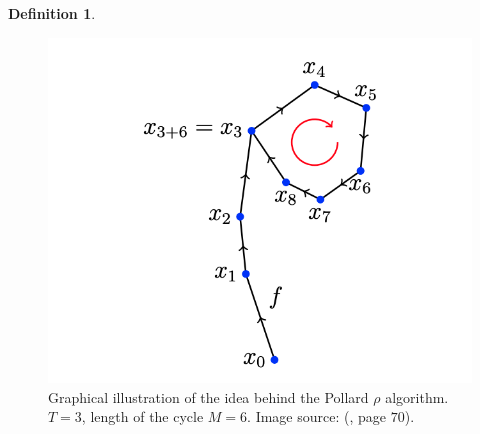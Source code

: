 \documentclass[thesis=M,english]{FITthesis}[2012/10/20]
\theoremstyle{remark}
\theoremstyle{definition}
\newtheorem{DF}{Definition}[section]
\begin{document}
\begin{DF}
 \begin{figure}[h]
 \centering
 \hspace*{-1cm}
 	\includegraphics[width=1\textwidth]{rho.png}
 	\caption[Graphical illustration of Pollard $\rho$ collision idea.]{Graphical illustration of the idea behind the Pollard $\rho$ algorithm. $T = 3$, length of the cycle $M = 6$. Image source: (\cite{mky}, page $70$).}
 	\label{rho}
 \end{figure}
 \end{DF}
\end{document}
